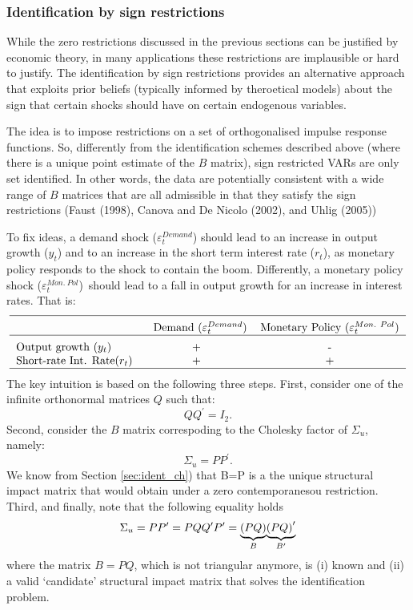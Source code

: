 \documentclass[10pt]{article}
\begin{document}
\subsubsection{Identification by sign restrictions}

While the zero restrictions discussed in the previous sections can be
justified by economic theory, in many applications these restrictions are
implausible or hard to justify. The identification by sign restrictions
provides an alternative approach that exploits prior beliefs (typically
informed by theroetical models) about the sign that certain shocks should
have on certain endogenous variables.

The idea is to impose restrictions on a set of orthogonalised impulse
response functions. So, differently from the identification schemes
described above (where there is a unique point estimate of the $B$ matrix),
sign restricted VARs are only set identified. In other words, the data are
potentially consistent with a wide range of $B$ matrices that are all
admissible in that they satisfy the sign restrictions (Faust (1998), Canova
and De Nicolo (2002), and Uhlig (2005))

To fix ideas, a demand shock ($\varepsilon _{t}^{Demand}$) should lead to an
increase in output growth ($y_{t}$) and to an increase in the short term
interest rate ($r_{t}$), as monetary policy responds to the shock to contain
the boom. Differently, a monetary policy shock ($\varepsilon _{t}^{Mon.\ Pol}
$)\ should lead to a fall in output growth for an increase in interest
rates. That is:%
\begin{equation*}
\begin{tabular}{lcc}
\hline
\addlinespace & $\text{Demand}$ ($\varepsilon _{t}^{Demand}$) & Monetary
Policy ($\varepsilon _{t}^{Mon.\ Pol}$) \\ \hline
\addlinespace Output growth ($y_{t}$) & + & - \\
Short-rate Int. Rate($r_{t}$) & + & + \\ \hline
\end{tabular}%
\end{equation*}%
The key intuition is based on the following three steps. First, consider one
of the infinite orthonormal matrices $Q$ such that:%
\begin{equation*}
QQ^{\prime }=I_{2}.
\end{equation*}%
Second, consider the $B$ matrix correspoding to the Cholesky factor of $%
\Sigma _{u}$, namely:%
\begin{equation*}
\Sigma _{u}=PP^{\prime }.
\end{equation*}%
We know from Section \ref{sec:ident_ch}) that B=P is a the unique structural
impact matrix that would obtain under a zero contemporanesou restriction.
Third, and finally, note that the following equality holds%
\begin{equation*}
\Sigma _{u}=PP^{\prime }=PQQ^{\prime }P^{\prime }=\underset{B}{\underbrace{%
\left( PQ\right) }}\underset{B^{\prime }}{\underbrace{\left( PQ\right)
^{\prime }}}
\end{equation*}%
where the matrix $B=PQ$, which is not triangular anymore, is (i) known and
(ii) a valid `candidate' structural impact matrix that solves the
identification problem.
\end{document}
